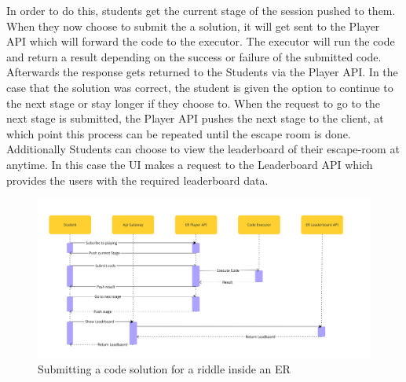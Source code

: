 In order to do this, students get the current stage of the session pushed to them. When they now choose to submit the a solution, it will get sent to the Player API which will forward the code to the executor. The executor will run the code and return a result depending on the success or failure of the submitted code. Afterwards the response gets returned to the Students via the Player API. In the case that the solution was correct, the student is given the option to continue to the next stage or stay longer if they choose to. When the request to go to the next stage is submitted, the Player API pushes the next stage to the client, at which point this process can be repeated until the escape room is done. \\
Additionally Students can choose to view the leaderboard of their escape-room at anytime. In this case the UI makes a request to the Leaderboard API which provides the users with the required leaderboard data.

\begin{figure}[h!]
    \centering
    \includegraphics[width=1\linewidth]{images/Sequence Diagrams/SEP1 - EscapeDOOM - Sequenzdiagramm - Play Escaperoom.jpg}
    \caption{Submitting a code solution for a riddle inside an ER}
    \label{fig:sequenceDiag:send_riddle_solution}
\end{figure}